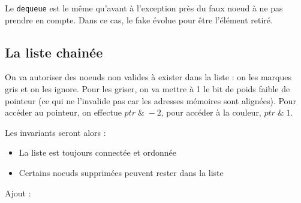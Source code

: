 \documentclass{article}
\begin{document}
Le \texttt{dequeue} est le même qu'avant à l'exception près du faux noeud à ne pas prendre en compte. Dans ce cas, le fake évolue pour être l'élément retiré.




\subsection{La liste chainée}
On va autoriser des noeuds non valides à exister dans la liste : on les marques gris et on les ignore. Pour les griser, on va mettre à 1 le bit de poids faible de pointeur (ce qui ne l'invalide pas car les adresses mémoires sont alignées). Pour accéder au pointeur, on effectue $ptr \; \& \; -2$, pour accéder à la couleur, $ptr \; \& \; 1$.

Les invariants seront alors :
\begin{itemize}
\item La liste est toujours connectée et ordonnée
\item Certains noeuds supprimées peuvent rester dans la liste
\end{itemize}

\begin{algorithm}[H]

\end{algorithm}


Ajout :
\end{document}
